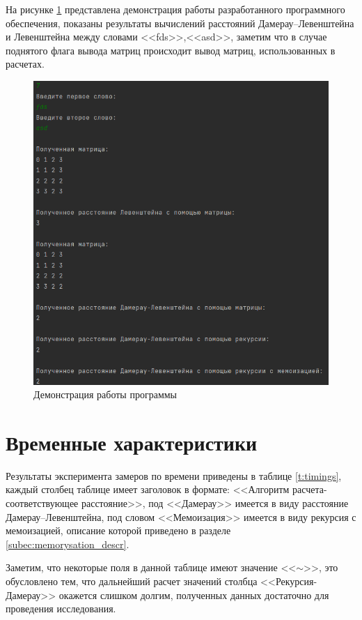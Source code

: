 На рисунке \ref{img:demonstration} представлена демонстрация работы разработанного программного обеспечения, 
показаны результаты вычислений расстояний Дамерау--Левенштейна и Левенштейна между словами <<fds>>,<<asd>>, заметим
что в случае поднятого флага вывода матриц происходит вывод матриц, использованных в расчетах.
\clearpage
\begin{figure}[H]
	\centering
	\includegraphics[height=0.7\textheight]{../img/programm_work.png}
	\caption{Демонстрация работы программы}
	\label{img:demonstration}
\end{figure}

\clearpage

\section{Временные характеристики}

Результаты эксперимента замеров по времени приведены в таблице \ref{t:timings}, каждый столбец таблице имеет заголовок в формате:
<<Алгоритм расчета-соответствующее расстояние>>, под <<Дамерау>> имеется в виду расстояние Дамерау--Левенштейна, под словом
<<Мемоизация>> имеется в виду  рекурсия с мемоизацией, описание которой приведено в разделе \ref{subec:memorysation_descr}.

Заметим, что некоторые поля в данной таблице
имеют значение <<$\sim$>>, это обусловлено тем, что дальнейший расчет значений столбца <<Рекурсия-Дамерау>> окажется слишком
долгим, полученных данных достаточно для проведения исследования.

